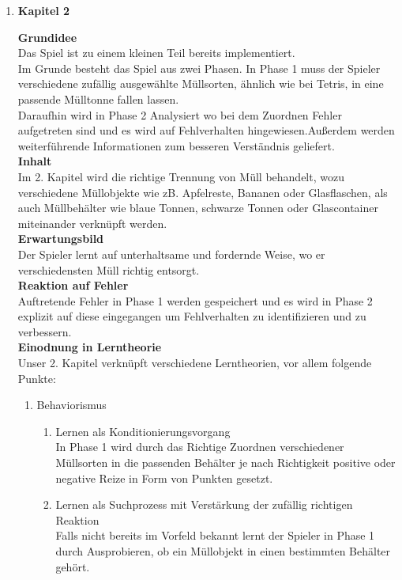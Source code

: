 \documentclass[a4paper]{article}
\newcommand{\TOP}[1]{\item \textbf{#1}\par}
\begin{document}
\begin{enumerate}
\TOP{Kapitel 2}
\textbf{Grundidee}\\
Das Spiel ist zu einem kleinen Teil bereits implementiert.\\
Im Grunde besteht das Spiel aus zwei Phasen. In Phase 1 muss der Spieler verschiedene zufällig ausgewählte Müllsorten, ähnlich wie bei Tetris, in eine passende Mülltonne fallen lassen.\\
Daraufhin wird in Phase 2 Analysiert wo bei dem Zuordnen Fehler aufgetreten sind und es wird auf Fehlverhalten hingewiesen.Außerdem werden weiterführende Informationen zum besseren Verständnis geliefert.\\
\textbf{Inhalt}\\
Im 2. Kapitel wird die richtige Trennung von Müll behandelt, wozu verschiedene Müllobjekte wie zB. Apfelreste, Bananen oder Glasflaschen, als auch Müllbehälter wie blaue Tonnen, schwarze Tonnen oder Glascontainer miteinander verknüpft werden.\\
\textbf{Erwartungsbild}\\
Der Spieler lernt auf unterhaltsame und fordernde Weise, wo er verschiedensten Müll richtig entsorgt.\\
\textbf{Reaktion auf Fehler}\\
Auftretende Fehler in Phase 1 werden gespeichert und es wird in Phase 2 explizit auf diese eingegangen um Fehlverhalten zu identifizieren und zu verbessern.\\
\textbf{Einodnung in Lerntheorie}\\
Unser 2. Kapitel verknüpft verschiedene Lerntheorien, vor allem folgende Punkte:\\
\begin{enumerate}


\item Behaviorismus
  \begin{enumerate}
    \item Lernen als Konditionierungsvorgang\\
    In Phase 1 wird durch das Richtige Zuordnen verschiedener Müllsorten in die passenden Behälter je nach Richtigkeit positive oder negative Reize in Form von Punkten gesetzt.
    \item Lernen als Suchprozess mit Verstärkung der zufällig richtigen Reaktion\\
     Falls nicht bereits im Vorfeld bekannt lernt der Spieler in Phase 1 durch Ausprobieren, ob ein Müllobjekt in einen bestimmten Behälter gehört.
  \end{enumerate}
  

\end{enumerate}
\end{enumerate}
\end{document}
